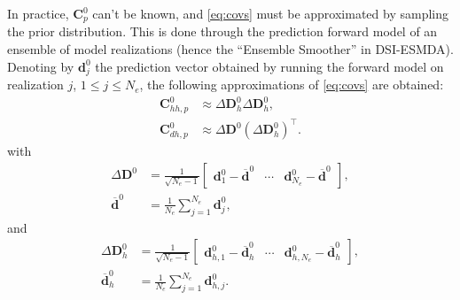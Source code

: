 In practice, $\mathbf{C}^0_p$ can't be known, and \cref{eq:covs} must be approximated 
by sampling the prior distribution.
%
This is done through the prediction forward model of an ensemble of model realizations
(hence the ``Ensemble Smoother'' in DSI-ESMDA).
%
Denoting by $\mathbf{d}^0_j$ the prediction vector obtained by running the forward model on realization $j$,
$1\leq j\leq N_e$, the following approximations of \cref{eq:covs} are obtained:
%
\begin{subequations}
    \begin{alignat}{4}
    \mathbf{C}^0_{hh,p} &\approx \Delta\mathbf{D}^0_h\Delta\mathbf{D}^0_h,
    \\
        \mathbf{C}^0_{dh,p} &\approx \Delta\mathbf{D}^0(\Delta\mathbf{D}^0_h)^\top.
    \end{alignat}
\label{eq:covs-approximation}
\end{subequations}
%
with
%
\begin{subequations}
    \begin{alignat}{4}
        \Delta\mathbf{D}^0 &= \frac{1}{\sqrt{N_e-1}} 
        \begin{bmatrix}
            \mathbf{d}^0_1 - \overline{\mathbf{d}}^0 &
            \cdots &
            \mathbf{d}^0_{N_e} - \overline{\mathbf{d}}^0
        \end{bmatrix}, 
    \label{eq:delta-d}
    \\
        \overline{\mathbf{d}}^0 &= \frac{1}{N_e} 
        \sum_{j=1}^{N_e} \mathbf{d}^0_j,
    \end{alignat}
\end{subequations}
%
and
%
\begin{subequations}
    \begin{alignat}{4}
        \Delta\mathbf{D}^0_h &= \frac{1}{\sqrt{N_e-1}} 
        \begin{bmatrix}
            \mathbf{d}^0_{h, 1} - \overline{\mathbf{d}}^0_h &
            \cdots &
            \mathbf{d}^0_{h, N_e} - \overline{\mathbf{d}}^0_h
        \end{bmatrix}, 
    \\
        \overline{\mathbf{d}}^0_h &= \frac{1}{N_e} 
        \sum_{j=1}^{N_e} \mathbf{d}^0_{h, j}.
    \end{alignat}
\end{subequations}

